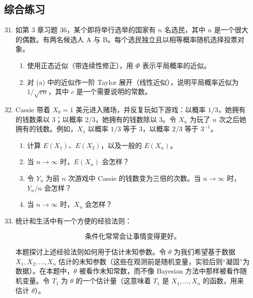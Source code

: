 \documentclass[UTF8,12pt,a4paper,fontset=fandol]{ctexart}
\begin{document}
\subsection*{综合练习}

\begin{enumerate}
  \setcounter{enumi}{30}
  \item 如第 3 章习题 36，某个即将举行选举的国家有 $n$ 名选民，其中 $n$ 是一个很大的偶数。有两名候选人 A 与 B。每个选民独立且以相等概率随机选择投票对象。
  \begin{enumerate}
    \item 使用正态近似（带连续性修正），用 $\Phi$ 表示平局概率的近似。
    \item 对 (a) 中的近似作一阶 Taylor 展开（线性近似），说明平局概率近似为 $1/\sqrt{cn}$，其中 $c$ 是一个需要说明的常数。
  \end{enumerate}

  \item Cassie 带着 $X_0=1$ 美元进入赌场，并反复玩如下游戏：以概率 $1/3$，她拥有的钱数乘以 $3$；以概率 $2/3$，她拥有的钱数除以 $3$。令 $X_n$ 为玩了 $n$ 次之后她拥有的钱数。例如，$X_1$ 以概率 $1/3$ 等于 $3$，以概率 $2/3$ 等于 $3^{-1}$。
  \begin{enumerate}
    \item 计算 $E(X_1)$、$E(X_2)$，以及一般的 $E(X_n)$。
    \item 当 $n\to\infty$ 时，$E(X_n)$ 会怎样？
    \item 令 $Y_n$ 为前 $n$ 次游戏中 Cassie 的钱数变为三倍的次数。当 $n\to\infty$ 时，$Y_n/n$ 会怎样？
    \item 当 $n\to\infty$ 时，$X_n$ 会怎样？
  \end{enumerate}

  \item 统计和生活中有一个方便的经验法则：

  \[
    \text{条件化常常会让事情变得更好。}
  \]

  本题探讨上述经验法则如何用于估计未知参数。令 $\theta$ 为我们希望基于数据 $X_1,X_2,\ldots,X_n$ 估计的未知参数（这些在观测前是随机变量，实验后则“凝固”为数据）。在本题中，$\theta$ 被看作未知常数，而不像 Bayesian 方法中那样被看作随机变量。令 $T_1$ 为 $\theta$ 的一个估计量（这意味着 $T_1$ 是 $X_1,\ldots,X_n$ 的函数，用来估计 $\theta$）。


\end{enumerate}
\end{document}

